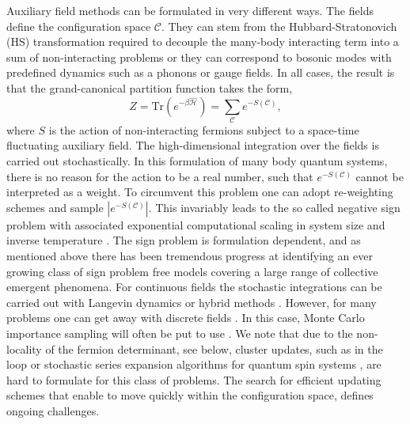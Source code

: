 Auxiliary field methods  can be formulated in very different ways.  The fields define  the  configuration space $\mathcal{C}$. They can stem from the Hubbard-Stratonovich (HS)  \cite{Hubbard59} transformation required to decouple the  many-body interacting term into a sum of non-interacting problems or they can correspond to  bosonic modes  with predefined dynamics such as a phonons or gauge fields. In all cases, the result is that  the grand-canonical partition function  takes the form, 
\begin{equation}
	 Z = \text{Tr}\left( e^{-\beta \hat{\mathcal{H}}}\right)   =   \sum_{\mathcal{C}} e^{-S(\mathcal{C}) },
\end{equation}
where  $S$  is the action of non-interacting fermions subject to a  space-time fluctuating auxiliary field.    
The high-dimensional  integration  over the fields is carried out stochastically.  In this formulation of many  body quantum systems, there is no reason for the action to be a real number, such that $e^{-S(\mathcal{C})}$ cannot be interpreted as a weight. To circumvent this problem one can adopt   re-weighting schemes and sample $| e^{-S(\mathcal{C})}| $. This invariably leads to the so called negative sign problem with associated exponential computational scaling in system size and inverse temperature \cite{Troyer05}.    The  sign problem is formulation dependent, and as mentioned above there has been tremendous progress at identifying an ever growing class of sign problem free models covering a  large range of collective emergent  phenomena.  
 For continuous fields the stochastic integrations can  be carried out with Langevin  dynamics or hybrid methods \cite{Duane85}.   However, for many  problems one can get away with discrete fields \cite{Hirsch83}. In this case,  Monte Carlo importance sampling will often be put to use \cite{Sokal89}.  
We note that  due to  the non-locality of the fermion determinant, see below, cluster updates,  such as in the loop or stochastic series expansion algorithms
 for quantum spin systems  \cite{Evertz93,Sandvik99b,Sandvik02}, are hard to formulate for this class of problems.  The search for efficient updating schemes that enable to move quickly within the configuration space, defines ongoing challenges. 

